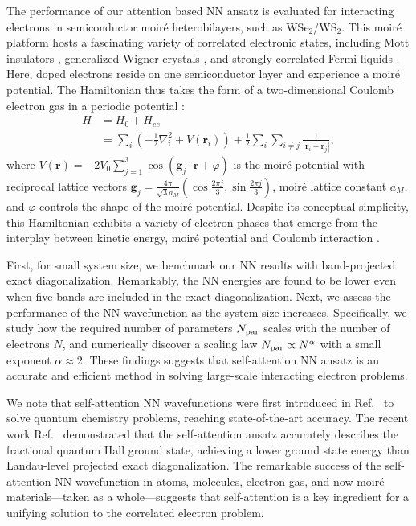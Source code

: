 \documentclass[
 reprint,
 amsmath,amssymb,
 aps, prx,
floatfix,longbibliography,
]{revtex4-2}
\begin{document}
The performance of our attention based NN ansatz is evaluated for interacting electrons in semiconductor moir\'e heterobilayers, such as WSe$_2$/WS$_2$. 
This moir\'e platform hosts a fascinating variety of correlated electronic states, including Mott insulators \cite{regan2020mott, tangSimulationHubbardModel2020a,Arsenault2024Mar}, generalized Wigner crystals \cite{li2021imaging}, and strongly correlated Fermi liquids \cite{Zhao2023}. 
Here, doped electrons reside on one semiconductor layer and experience a moir\'e potential. The Hamiltonian thus takes the form of a two-dimensional Coulomb electron gas in a periodic potential \cite{Wu2018}: 
\begin{align}
    H & = H_0 + H_{ee} \nonumber\\
    & = \sum_i \left( 
-\frac{1}{2}\nabla_i^2 + V(\mathbf{r}_i) 
\right) 
+ \frac{1}{2} \sum_i \sum_{i \neq j} \frac{1}{|\mathbf{r}_i - \mathbf{r}_j|}, 
\label{eq:system-hamiltonian}
\end{align}
where $V(\mathbf{r}) = -2V_0 \sum_{j=1}^3 \cos(\mathbf{g}_j \cdot \mathbf{r} + \varphi)$ is the moir\'e potential with reciprocal lattice vectors $\mathbf{g}_j = \frac{4\pi}{\sqrt{3}a_M} (\cos \frac{2\pi j}{3}, \sin \frac{2\pi j}{3})$, moir\'e lattice constant $a_M$, and $\varphi$ controls the shape of the moir\'e potential. Despite its conceptual simplicity, this Hamiltonian exhibits a variety of electron phases that emerge from the interplay between kinetic energy, moir\'e potential and Coulomb interaction \cite{zhang2020density, reddy2023artificial}.


First, for small system size, we benchmark our NN results with band-projected exact diagonalization. Remarkably, the NN energies are found to be lower even when five bands are included in the exact diagonalization. 
%
Next, we assess the performance of the NN wavefunction as the system size increases. 
%
Specifically, we study how the required number of parameters $N_{\rm par}$ scales with the number of electrons $N$,
and numerically discover a scaling law $N_{\rm par} \propto N^\alpha$ with a small exponent $\alpha \approx 2$.
%
These findings suggests that self-attention NN ansatz is an accurate and efficient method in solving large-scale interacting electron problems. 

We note that self-attention NN wavefunctions were first introduced in Ref.~\cite{vonGlehn2022Nov} to solve quantum chemistry problems, reaching state-of-the-art accuracy.
%
The recent work Ref.~\cite{Teng2024Nov} demonstrated that the self-attention ansatz accurately describes the fractional quantum Hall ground state, achieving a lower ground state energy than Landau-level projected exact diagonalization. 
%
The remarkable success of the self-attention NN wavefunction in atoms, molecules, electron gas, and now moir\'e materials---taken as a whole---suggests that self-attention is a key ingredient for a unifying solution to the correlated electron problem. 
\end{document}
